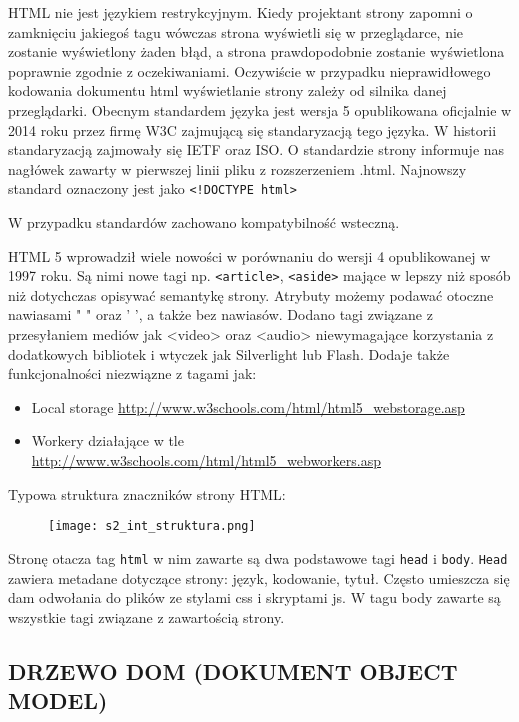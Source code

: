 HTML nie jest językiem restrykcyjnym. Kiedy projektant strony zapomni o zamknięciu jakiegoś tagu wówczas strona wyświetli się w przeglądarce, nie zostanie wyświetlony żaden błąd, a strona prawdopodobnie zostanie wyświetlona poprawnie zgodnie z oczekiwaniami. Oczywiście w przypadku nieprawidłowego kodowania dokumentu html wyświetlanie strony zależy od silnika danej przeglądarki. Obecnym standardem języka jest wersja 5 opublikowana oficjalnie w 2014 roku przez firmę W3C zajmującą się standaryzacją tego języka. W historii standaryzacją zajmowały się IETF oraz ISO. O standardzie strony informuje nas nagłówek zawarty w pierwszej linii pliku z rozszerzeniem .html. Najnowszy standard oznaczony jest jako \texttt{<!DOCTYPE html>}

W przypadku standardów zachowano kompatybilność wsteczną.

HTML 5 wprowadził wiele nowości w porównaniu do wersji 4 opublikowanej w 1997 roku. Są nimi nowe tagi np. \texttt{<article>}, \texttt{<aside>} mające w lepszy niż sposób niż dotychczas opisywać semantykę strony. Atrybuty możemy podawać otoczne nawiasami " " oraz ' ', a także bez nawiasów. Dodano tagi związane z przesyłaniem mediów jak <video> oraz <audio> niewymagające korzystania z dodatkowych bibliotek i wtyczek jak Silverlight lub Flash. Dodaje także funkcjonalności niezwiązne z tagami jak:
\begin{itemize}
\item Local storage \url{http://www.w3schools.com/html/html5_webstorage.asp}
\item Workery działające w tle \url{http://www.w3schools.com/html/html5_webworkers.asp}
\end{itemize}

Typowa struktura znaczników strony HTML:

\begin{figure}[H]
\centering
\texttt{[image: s2\_int\_struktura.png]}
\end{figure}

Stronę otacza tag \texttt{html} w nim zawarte są dwa podstawowe tagi \texttt{head} i \texttt{body}. \texttt{Head} zawiera metadane dotyczące strony: język, kodowanie, tytuł. Często umieszcza się dam odwołania do plików ze stylami css i skryptami js. W tagu body zawarte są wszystkie tagi związane z zawartością strony.

\subsection{DRZEWO DOM (DOKUMENT OBJECT MODEL)}

